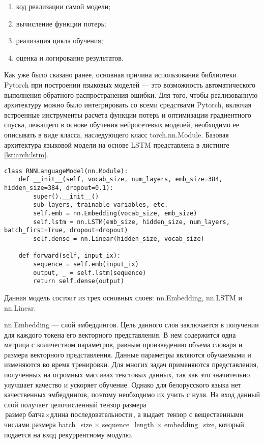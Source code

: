 \begin{enumerate}
	\item код реализации самой модели;
	\item вычисление функции потерь;
	\item реализация цикла обучения;
	\item оценка и логирование результатов.
\end{enumerate}

Как уже было сказано ранее, основная причина использования библиотеки Pytorch при построении языковых моделей --- это возможность автоматического выполнения обратного распространения ошибки. Для того, чтобы реализованную архитектуру можно было интегрировать со всеми средствами Pytorch, включая встроенные инструменты расчета функции потерь и оптимизации градиентного спуска, лежащего в основе обучения нейросетевых моделей, необходимо ее описывать в виде класса, наследующего класс torch.nn.Module. Базовая архитектура языковой модели на основе LSTM представлена в листинге \ref{lst:arch:lstm}.

\begin{lstlisting}[caption={Реализация простой языковой модели на основе LSTM}, label=lst:arch:lstm]
class RNNLanguageModel(nn.Module):
	def __init__(self, vocab_size, num_layers, emb_size=384, hidden_size=384, dropout=0.1):
		super().__init__()
		sub-layers, trainable variables, etc.
		self.emb = nn.Embedding(vocab_size, emb_size)
		self.lstm = nn.LSTM(emb_size, hidden_size, num_layers, batch_first=True, dropout=dropout)
		self.dense = nn.Linear(hidden_size, vocab_size)
	
	def forward(self, input_ix):
		sequence = self.emb(input_ix)
		output, _ = self.lstm(sequence)
		return self.dense(output)  
\end{lstlisting}

Данная модель состоит из трех основных слоев: nn.Embedding, nn.LSTM и nn.Linear.

nn.Embedding --- слой эмбеддингов. Цель данного слоя заключается в получении для каждого токена его векторного представления. В нем содержится одна матрица с количеством параметров, равным произведению объема словаря и размера векторного представления. Данные параметры являются обучаемыми и изменяются во время тренировки. Для многих задач применяются представления, полученных на огромных массивах текстовых данных, так как это значительно улучшает качество и ускоряет обучение. Однако для белорусского языка нет качественных эмбеддингов, поэтому необходимо их учить с нуля. На вход данный слой получает целочисленный тензор размера $\text{размер батча} \times \text{длина последовательности}$, а выдает тензор с вещественными числами размера batch\_size $\times$ sequence\_length $\times$ embedding\_size, который подается на вход рекуррентному модулю.
	
